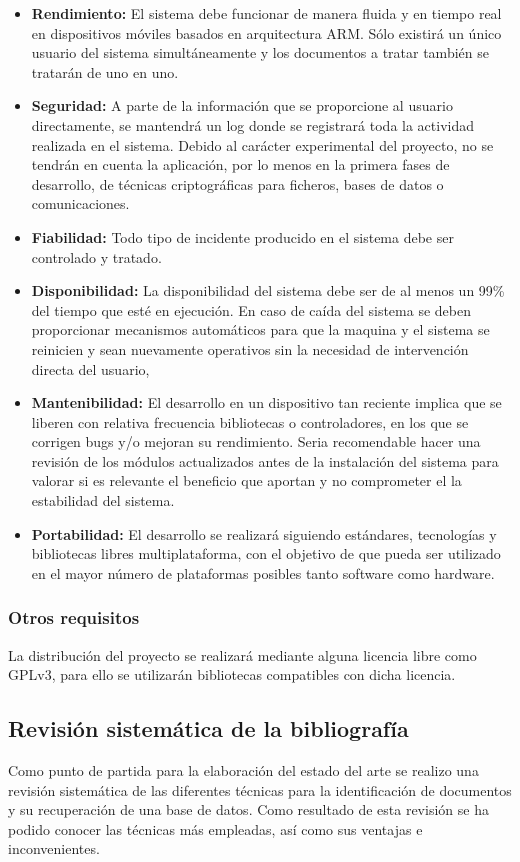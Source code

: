 \begin{itemize}
\item\textbf{Rendimiento:} El sistema debe funcionar de manera fluida y en tiempo real en dispositivos móviles basados en arquitectura ARM. Sólo existirá un único usuario del sistema simultáneamente y los documentos a tratar también se tratarán de uno en uno.
\item\textbf{Seguridad:} A parte de la información que se proporcione al usuario directamente, se mantendrá un log donde se registrará toda la actividad realizada en el sistema.
Debido al carácter experimental del proyecto, no se tendrán en cuenta la aplicación, por lo menos en la primera fases de desarrollo, de técnicas criptográficas para ficheros, bases de datos o comunicaciones.
\item\textbf{Fiabilidad:} Todo tipo de incidente producido en el sistema debe ser controlado y tratado. 
\item\textbf{Disponibilidad:} La disponibilidad del sistema debe ser de al menos un 99\% del tiempo que esté en ejecución. En caso de caída del sistema se deben proporcionar mecanismos automáticos para que la maquina y el sistema se reinicien y sean nuevamente operativos sin la necesidad de intervención directa del usuario,
\item\textbf{Mantenibilidad:} El desarrollo en un dispositivo tan reciente implica que se liberen con relativa frecuencia bibliotecas o controladores, en los que se corrigen bugs y/o mejoran su rendimiento. Seria recomendable hacer una revisión de los módulos actualizados antes de la instalación del sistema para valorar si es relevante el beneficio que aportan y no comprometer el la estabilidad del sistema.  
\item\textbf{Portabilidad:} El desarrollo se  realizará siguiendo estándares, tecnologías y bibliotecas libres multiplataforma, con el objetivo de que pueda ser utilizado en el mayor número de plataformas posibles tanto software como hardware.
\end{itemize}
\subsubsection{Otros requisitos}
La distribución del proyecto se realizará mediante alguna licencia libre como GPLv3, para ello se utilizarán bibliotecas compatibles con dicha licencia.


\subsection{Revisión sistemática de la bibliografía}
Como punto de partida para la elaboración del estado del arte se realizo una revisión sistemática de las diferentes técnicas para la identificación de documentos y su recuperación de una base de datos. Como resultado de esta revisión se ha podido conocer las técnicas más empleadas, así como sus ventajas e inconvenientes. 

